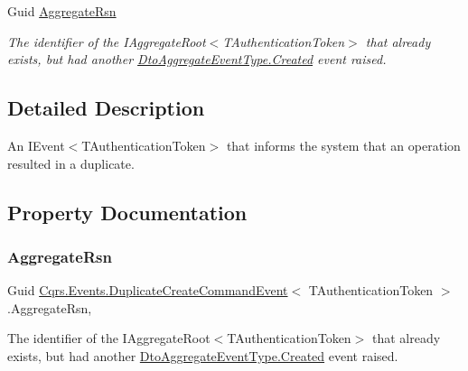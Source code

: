 \begin{DoxyCompactItemize}
Guid \hyperlink{classCqrs_1_1Events_1_1DuplicateCreateCommandEvent_a06ead08bb17fa98576201f301971fad2_a06ead08bb17fa98576201f301971fad2}{Aggregate\+Rsn}
\begin{DoxyCompactList}\small\item\em The identifier of the I\+Aggregate\+Root$<$\+T\+Authentication\+Token$>$ that already exists, but had another \hyperlink{namespaceCqrs_1_1Events_a2a32e13adeac92f5a93966cd8ee2d39a_a2a32e13adeac92f5a93966cd8ee2d39aa0eceeb45861f9585dd7a97a3e36f85c6}{Dto\+Aggregate\+Event\+Type.\+Created} event raised. \end{DoxyCompactList}\end{DoxyCompactItemize}


\subsection{Detailed Description}
An I\+Event$<$\+T\+Authentication\+Token$>$ that informs the system that an operation resulted in a duplicate. 



\subsection{Property Documentation}
\mbox{\label{classCqrs_1_1Events_1_1DuplicateCreateCommandEvent_a06ead08bb17fa98576201f301971fad2_a06ead08bb17fa98576201f301971fad2}} 
\subsubsection{\texorpdfstring{Aggregate\+Rsn}{AggregateRsn}}
{\footnotesize\ttfamily Guid \hyperlink{classCqrs_1_1Events_1_1DuplicateCreateCommandEvent}{Cqrs.\+Events.\+Duplicate\+Create\+Command\+Event}$<$ T\+Authentication\+Token $>$.Aggregate\+Rsn\hspace{0.3cm}{\ttfamily [get]}, {\ttfamily [set]}}



The identifier of the I\+Aggregate\+Root$<$\+T\+Authentication\+Token$>$ that already exists, but had another \hyperlink{namespaceCqrs_1_1Events_a2a32e13adeac92f5a93966cd8ee2d39a_a2a32e13adeac92f5a93966cd8ee2d39aa0eceeb45861f9585dd7a97a3e36f85c6}{Dto\+Aggregate\+Event\+Type.\+Created} event raised. 

